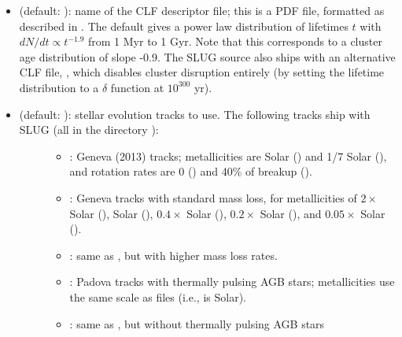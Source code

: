 \documentclass[letterpaper,10pt,english]{sphinxmanual}
\begin{document}
\begin{itemize}
\item {} 
 (default: ): name of the CLF descriptor file; this is a PDF file, formatted as described in {\hyperref[\detokenize{pdfs:sec-pdfs}]{}}. The default gives a power law distribution of lifetimes \(t\) with \(dN/dt\propto t^{-1.9}\) from 1 Myr to 1 Gyr. Note that this corresponds to a cluster age distribution of slope -0.9. The SLUG source also ships with an alternative CLF file, , which disables cluster disruption entirely (by setting the lifetime distribution to a \(\delta\) function at \(10^{300}\) yr).

\item {} \begin{description}
\item[{ (default: ): stellar evolution tracks to use. The following tracks ship with SLUG (all in the directory ):}] \leavevmode\begin{itemize}
\item {} 
: Geneva (2013) tracks; metallicities are Solar () and 1/7 Solar (), and rotation rates are 0 () and 40\% of breakup ().

\item {} 
: Geneva tracks with standard mass loss, for metallicities of \(2\times\) Solar (), Solar (), \(0.4\times\) Solar (), \(0.2\times\) Solar (), and \(0.05\times\) Solar ().

\item {} 
: same as , but with higher mass loss rates.

\item {} 
: Padova tracks with thermally pulsing AGB stars; metallicities use the same scale as  files (i.e.,  is Solar).

\item {} 
: same as , but without thermally pulsing AGB stars

\end{itemize}

\end{description}


\end{itemize}
\end{document}
